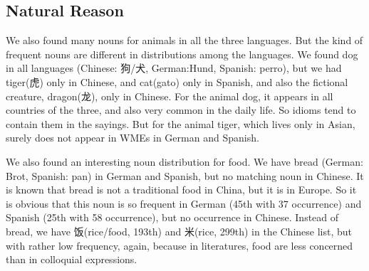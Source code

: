 \subsection{Natural Reason}
We also found many nouns for animals in all the three languages. But the kind of frequent nouns are different in distributions among the languages. We found dog in all languages (Chinese: 狗/犬, German:Hund, Spanish: perro), but we had tiger(虎) only in Chinese, and cat(gato) only in Spanish, and also the fictional creature, dragon(龙), only in Chinese. 
For the animal dog, it appears in all countries of the three, and also very common in the daily life. So idioms tend to contain them in the sayings. But for the animal tiger, which lives only in Asian, surely does not appear in WMEs in German and Spanish. 

We also found an interesting noun distribution for food. We have bread (German: Brot, Spanish: pan) in German and Spanish, but no matching noun in Chinese. It is known that bread is not a traditional food in China, but it is in Europe. So it is obvious that this noun is so frequent in German (45th with 37 occurrence) and Spanish (25th with 58 occurrence), but no occurrence in Chinese. Instead of bread, we have 饭(rice/food, 193th) and 米(rice, 299th) in the Chinese list, but with rather low frequency, again, because in literatures, food are less concerned than in colloquial expressions. 